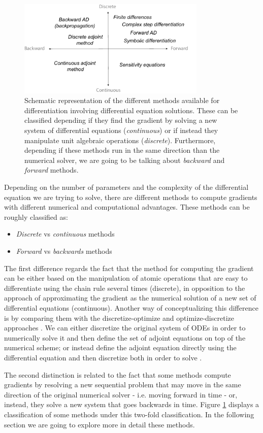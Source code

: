 \begin{figure}[]
    \centering
    \includegraphics[width=0.80\textwidth]{figures/scheme-methods.pdf}
    \caption{Schematic representation of the different methods available for differentiation involving differential equation solutions. These can be classified depending if they find the gradient by solving a new system of differential equations (\textit{continuous}) or if instead they manipulate unit algebraic operations (\textit{discrete}). Furthermore, depending if these methods run in the same direction than the numerical solver, we are going to be talking about \textit{backward} and \textit{forward} methods.}
    \label{fig:diff}
\end{figure}
Depending on the number of parameters and the complexity of the differential equation we are trying to solve, there are different methods to compute gradients with different numerical and computational advantages.
These methods can be roughly classified as:
\begin{itemize}
    \item \textit{Discrete} vs \textit{continuous} methods
    \item \textit{Forward} vs \textit{backwards} methods
\end{itemize}
The first difference regards the fact that the method for computing the gradient can be either based on the manipulation of atomic operations that are easy to differentiate using the chain rule several times (discrete), in opposition to the approach of approximating the gradient as the numerical solution of a new set of differential equations (continuous).
Another way of conceptualizing this difference is by comparing them with the discretize-optimize and optimize-discretize approaches \cite{bradley2013pde, Onken_Ruthotto_2020}.   
We can either discretize the original system of ODEs in order to numerically solve it and then define the set of adjoint equations on top of the numerical scheme; or instead define the adjoint equation directly using the differential equation and then discretize both in order to solve \cite{Giles_Pierce_2000}.

The second distinction is related to the fact that some methods compute gradients by resolving a new sequential problem that may move in the same direction of the original numerical solver - i.e. moving forward in time - or, instead, they solve a new system that goes backwards in time. 
Figure \ref{fig:diff} displays a classification of some methods under this two-fold classification. In the following section we are going to explore more in detail these methods.

